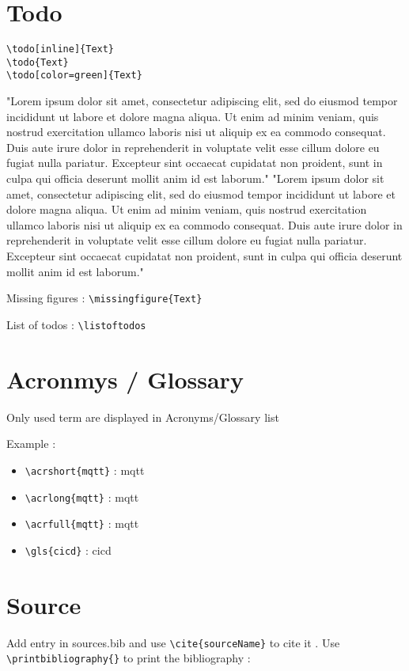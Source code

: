 \documentclass[
    fr,
    twoside]{customTemplate}
\begin{document}
\section{Todo}

\verb+\todo[inline]{Text}+\\
\verb+\todo{Text}+\\
\verb+\todo[color=green]{Text}+

"Lorem ipsum dolor sit amet, consectetur adipiscing elit, sed do eiusmod tempor incididunt ut labore et dolore magna aliqua. Ut enim ad minim veniam, quis nostrud exercitation ullamco laboris nisi ut aliquip ex ea commodo consequat.  Duis aute irure dolor in reprehenderit in voluptate velit esse cillum dolore eu fugiat nulla pariatur. Excepteur sint occaecat cupidatat non proident, sunt in culpa qui officia deserunt mollit anim id est laborum."
"Lorem ipsum dolor sit amet, consectetur adipiscing elit, sed do eiusmod tempor incididunt ut labore et dolore magna aliqua. Ut enim ad minim veniam, quis nostrud exercitation ullamco laboris nisi ut aliquip ex ea commodo consequat. Duis aute irure dolor in reprehenderit in voluptate velit esse cillum dolore eu fugiat nulla pariatur. Excepteur sint occaecat cupidatat non proident, sunt in culpa qui officia deserunt mollit anim id est laborum."


Missing figures : \verb+\missingfigure{Text}+

\listoftodos
List of todos : \verb+\listoftodos+


\section{Acronmys / Glossary}
Only used term are displayed in Acronyms/Glossary list

Example :
\begin{itemize}
    \item \verb+\acrshort{mqtt}+ : \acrshort{mqtt}
    \item \verb+\acrlong{mqtt}+ : \acrlong{mqtt}
    \item \verb+\acrfull{mqtt}+ : \acrfull{mqtt}
    \item \verb+\gls{cicd}+ : \gls{cicd}
\end{itemize}

\section{Source}
Add entry in sources.bib and use \verb+\cite{sourceName}+ to cite it \cite{sourceName}.
Use \verb+\printbibliography{}+ to print the bibliography :
\printbibliography{}
\end{document}
